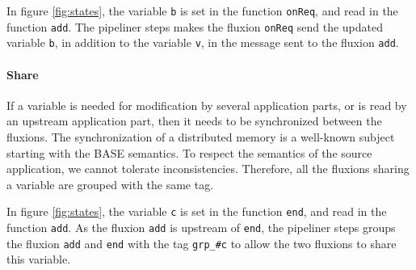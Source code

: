 In figure \ref{fig:states}, the variable \texttt{b} is set in the function \texttt{onReq}, and read in the function \texttt{add}.
The pipeliner steps makes the fluxion \texttt{onReq} send the updated variable \texttt{b}, in addition to the variable \texttt{v}, in the message sent to the fluxion \texttt{add}.


\paragraph{Share}
If a variable is needed for modification by several application parts, or is read by an upstream application part, then it needs to be synchronized between the fluxions.
The synchronization of a distributed memory is a well-known subject starting with %
the BASE semantics\cite{Fox1997}.
To respect the semantics of the source application, we cannot tolerate inconsistencies.
Therefore, all the fluxions sharing a variable are grouped with the same tag.

In figure \ref{fig:states}, the variable \texttt{c} is set in the function \texttt{end}, and read in the function \texttt{add}.
As the fluxion \texttt{add} is upstream of \texttt{end}, the pipeliner steps groups the fluxion \texttt{add} and \texttt{end} with the tag \texttt{grp_#c} to allow the two fluxions to share this variable.




\endinput






